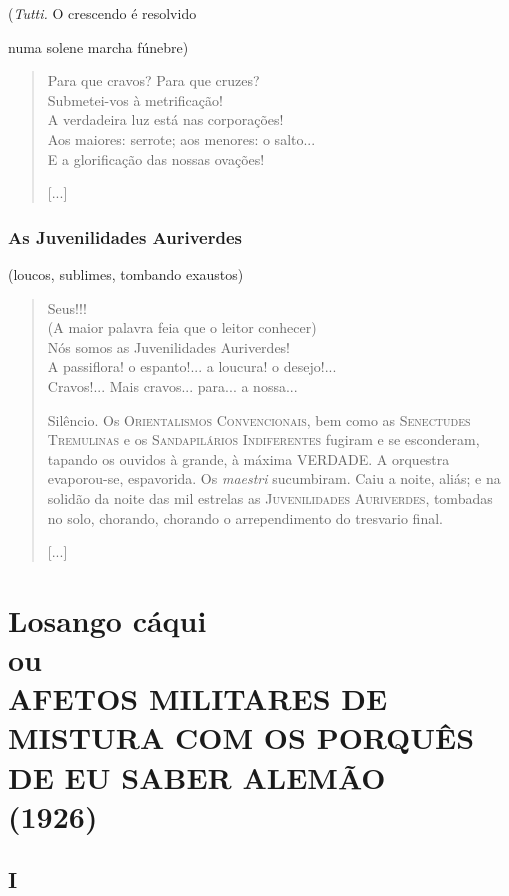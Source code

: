 \hfill{}(\emph{Tutti.} O crescendo é resolvido

\hfill{}numa solene marcha fúnebre)

\begin{verse}
Para que cravos? Para que cruzes?\\
Submetei-vos à metrificação!\\
A verdadeira luz está nas corporações!\\
Aos maiores: serrote; aos menores: o salto...\\
E a glorificação das nossas ovações!

{[}...{]}
\end{verse}

\section{As Juvenilidades Auriverdes}

\hfill{}(loucos, sublimes, tombando exaustos)

\begin{verse}
Seus\dotfill{}!!!\\
(A maior palavra feia que o leitor conhecer)\\
Nós somos as Juvenilidades Auriverdes!\\
A passiflora! o espanto!... a loucura! o desejo!...\\
Cravos!... Mais cravos... para... a nossa...

Silêncio. Os \textsc{Orientalismos Convencionais}, bem como as
\textsc{Senectudes Tremulinas} e os \textsc{Sandapilários Indiferentes}
fugiram e se esconderam, tapando os ouvidos à grande, à máxima VERDADE.
A orquestra evaporou-se, espavorida. Os \emph{maestri} sucumbiram. Caiu
a noite, aliás; e na solidão da noite das mil estrelas as
\textsc{Juvenilidades Auriverdes}, tombadas no solo, chorando, chorando
o arrependimento do tresvario final.

{[}...{]}
\end{verse}

\part[Losango cáqui]{Losango cáqui\\ou\\AFETOS MILITARES DE MISTURA COM OS PORQUÊS DE EU SABER ALEMÃO\\(1926)}
\removeepigraph

\chapter[I -- ``Meu coração estrala.'']{I}

